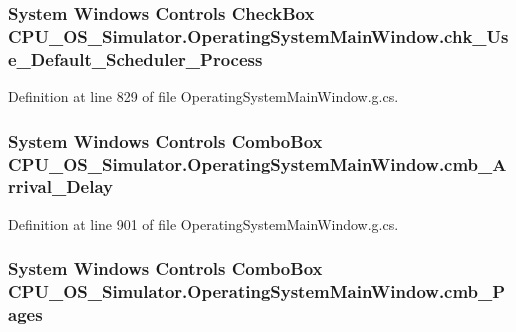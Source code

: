 \subsubsection[{chk\+\_\+\+Use\+\_\+\+Default\+\_\+\+Scheduler\+\_\+\+Process}]{\setlength{\rightskip}{0pt plus 5cm}System Windows Controls Check\+Box C\+P\+U\+\_\+\+O\+S\+\_\+\+Simulator.\+Operating\+System\+Main\+Window.\+chk\+\_\+\+Use\+\_\+\+Default\+\_\+\+Scheduler\+\_\+\+Process\hspace{0.3cm}{\ttfamily [package]}}\label{class_c_p_u___o_s___simulator_1_1_operating_system_main_window_a8af478cc94c72b0c843b4911f43aecdf}


Definition at line 829 of file Operating\+System\+Main\+Window.\+g.\+cs.

\hypertarget{class_c_p_u___o_s___simulator_1_1_operating_system_main_window_ad4e310b5bbd70de23e9132fb57229c96}{}
\subsubsection[{cmb\+\_\+\+Arrival\+\_\+\+Delay}]{\setlength{\rightskip}{0pt plus 5cm}System Windows Controls Combo\+Box C\+P\+U\+\_\+\+O\+S\+\_\+\+Simulator.\+Operating\+System\+Main\+Window.\+cmb\+\_\+\+Arrival\+\_\+\+Delay\hspace{0.3cm}{\ttfamily [package]}}\label{class_c_p_u___o_s___simulator_1_1_operating_system_main_window_ad4e310b5bbd70de23e9132fb57229c96}


Definition at line 901 of file Operating\+System\+Main\+Window.\+g.\+cs.

\hypertarget{class_c_p_u___o_s___simulator_1_1_operating_system_main_window_ab8bcdf83f7bfdecbdd3f8ba71cc92a5e}{}
\subsubsection[{cmb\+\_\+\+Pages}]{\setlength{\rightskip}{0pt plus 5cm}System Windows Controls Combo\+Box C\+P\+U\+\_\+\+O\+S\+\_\+\+Simulator.\+Operating\+System\+Main\+Window.\+cmb\+\_\+\+Pages\hspace{0.3cm}{\ttfamily [package]}}\label{class_c_p_u___o_s___simulator_1_1_operating_system_main_window_ab8bcdf83f7bfdecbdd3f8ba71cc92a5e}



